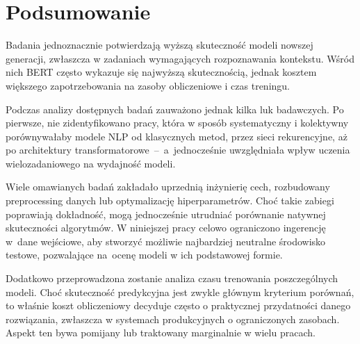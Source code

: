 \newpage
\section{Podsumowanie}
Badania jednoznacznie potwierdzają wyższą skuteczność modeli nowszej generacji, zwłaszcza w zadaniach wymagających rozpoznawania kontekstu. Wśród nich BERT często wykazuje się najwyższą skutecznością, jednak kosztem większego zapotrzebowania na zasoby obliczeniowe i czas treningu.

Podczas analizy dostępnych badań zauważono jednak kilka luk badawczych. Po pierwsze, nie zidentyfikowano pracy, która w sposób systematyczny i kolektywny porównywałaby modele NLP od klasycznych metod, przez sieci rekurencyjne, aż po architektury transformatorowe~--~a~jednocześnie uwzględniała wpływ uczenia wielozadaniowego na wydajność modeli. 

Wiele omawianych badań zakładało uprzednią inżynierię cech, rozbudowany preprocessing danych lub optymalizację hiperparametrów. Choć takie zabiegi poprawiają dokładność, mogą jednocześnie utrudniać porównanie natywnej skuteczności algorytmów. W niniejszej pracy celowo ograniczono ingerencję w~dane wejściowe, aby stworzyć możliwie najbardziej neutralne środowisko testowe, pozwalające na~ocenę modeli w ich podstawowej formie.

Dodatkowo przeprowadzona zostanie analiza czasu trenowania poszczególnych modeli. Choć skuteczność predykcyjna jest zwykle głównym kryterium porównań, to właśnie koszt obliczeniowy decyduje często o praktycznej przydatności danego rozwiązania, zwłaszcza w systemach produkcyjnych o ograniczonych zasobach. Aspekt ten bywa pomijany lub traktowany marginalnie w wielu pracach.

\endinput